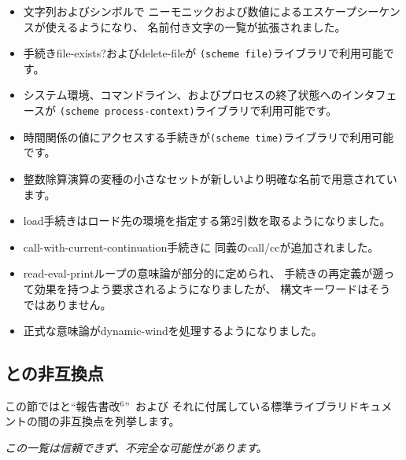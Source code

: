 \begin{itemize}
\item 文字列およびシンボルで
ニーモニックおよび数値によるエスケープシーケンスが使えるようになり、
名前付き文字の一覧が拡張されました。

\item 手続き{\cf file-exists?}および{\cf delete-file}が
{\tt (scheme file)}ライブラリで利用可能です。

\item システム環境、コマンドライン、およびプロセスの終了状態へのインタフェースが
{\tt (scheme process-context)}ライブラリで利用可能です。

\item 時間関係の値にアクセスする手続きが{\tt (scheme time)}ライブラリで利用可能です。

\item 整数除算演算の変種の小さなセットが新しいより明確な名前で用意されています。

\item {\cf load}手続きはロード先の環境を指定する第2引数を取るようになりました。

\item {\cf call-with-current-continuation}手続きに
同義の{\cf call/cc}が追加されました。

\item read-eval-printループの意味論が部分的に定められ、
手続きの再定義が遡って効果を持つよう要求されるようになりましたが、
構文キーワードはそうではありません。

\item 正式な意味論が{\cf dynamic-wind}を処理するようになりました。
\end{itemize}

\subsection*{\rsixrs との非互換点}
この節では\rsevenrs と``報告書改$^6$''~\cite{R6RS}および
それに付属している標準ライブラリドキュメントの間の非互換点を列挙します。

{\em この一覧は信頼できず、不完全な可能性があります。}

